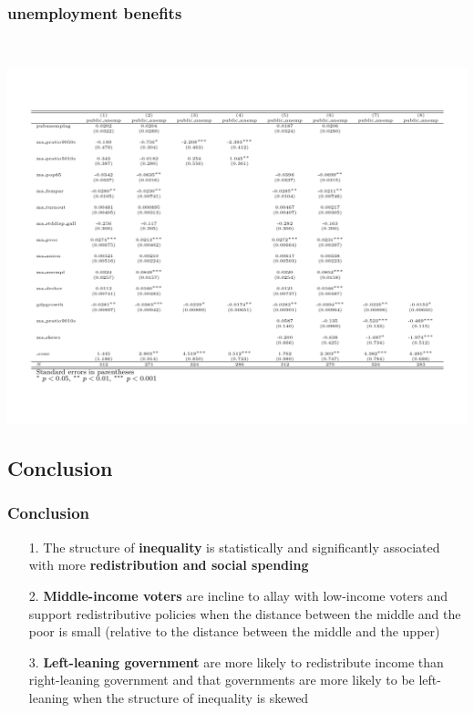 \documentclass{beamer}
\begin{document}
\begin{frame}
\frametitle{unemployment benefits}\
\begin{center}
\includegraphics[scale=0.35]{bene}
\end{center}
\end{frame}


\begin{frame}
\subsection{Conclusion}
\frametitle{Conclusion}
\begin{itemize}
\item[1.] The structure of \textbf{inequality} is statistically and significantly associated with more \textbf{redistribution and social spending}
\medskip
\medskip
\medskip
\item[2.] \textbf{Middle-income voters} are incline to allay with low-income voters and support redistributive policies when the distance between the middle and the poor is small (relative to the distance between the middle and the upper)
\medskip
\medskip
\medskip
\item[3.] \textbf{Left-leaning government} are more likely to redistribute income than right-leaning government and that governments are more likely to be left-leaning when the structure of inequality is skewed
\end{itemize}
\end{frame}
\end{document}
